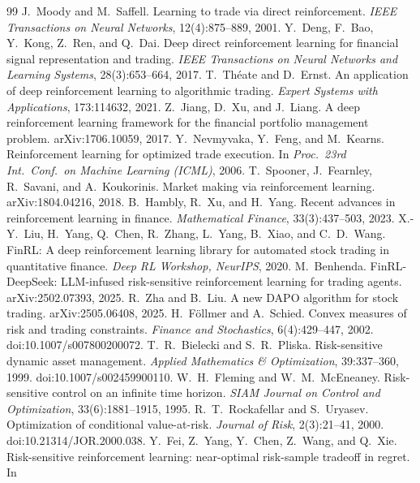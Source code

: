 \documentclass[11pt]{article}
\theoremstyle{definition}
\begin{document}
\begin{thebibliography}{99}
\small
{} J.~Moody and M.~Saffell. Learning to trade via direct
reinforcement. \emph{IEEE Transactions on Neural Networks}, 12(4):875--889, 2001.
 Y.~Deng, F.~Bao, Y.~Kong, Z.~Ren, and Q.~Dai. Deep direct
reinforcement learning for financial signal representation and trading. \emph{IEEE
Transactions on Neural Networks and Learning Systems}, 28(3):653--664, 2017.
 T.~Th\'eate and D.~Ernst. An application of deep reinforcement
learning to algorithmic trading. \emph{Expert Systems with Applications}, 173:114632,
2021.
 Z.~Jiang, D.~Xu, and J.~Liang. A deep reinforcement learning
framework for the financial portfolio management problem. arXiv:1706.10059, 2017.
 Y.~Nevmyvaka, Y.~Feng, and M.~Kearns. Reinforcement learning
for optimized trade execution. In \emph{Proc.\ 23rd Int.\ Conf.\ on Machine Learning
(ICML)}, 2006.
 T.~Spooner, J.~Fearnley, R.~Savani, and A.~Koukorinis. Market
making via reinforcement learning. arXiv:1804.04216, 2018.
 B.~Hambly, R.~Xu, and H.~Yang. Recent advances in reinforcement
learning in finance. \emph{Mathematical Finance}, 33(3):437--503, 2023.
 X.-Y.~Liu, H.~Yang, Q.~Chen, R.~Zhang, L.~Yang, B.~Xiao, and
C.~D.~Wang. FinRL: A deep reinforcement learning library for automated stock trading
in quantitative finance. \emph{Deep RL Workshop, NeurIPS}, 2020.
 M.~Benhenda. FinRL-DeepSeek: LLM-infused risk-sensitive
reinforcement learning for trading agents. arXiv:2502.07393, 2025.
 R.~Zha and B.~Liu. A new DAPO algorithm for stock trading.
arXiv:2505.06408, 2025.
 H.~F\"ollmer and A.~Schied. Convex measures of risk and trading
constraints. \emph{Finance and Stochastics}, 6(4):429--447, 2002.
doi:10.1007/s007800200072.
 T.~R.~Bielecki and S.~R.~Pliska. Risk-sensitive dynamic asset
management. \emph{Applied Mathematics \& Optimization}, 39:337--360, 1999.
doi:10.1007/s002459900110.
 W.~H.~Fleming and W.~M.~McEneaney. Risk-sensitive control on
an infinite time horizon. \emph{SIAM Journal on Control and Optimization},
33(6):1881--1915, 1995.
 R.~T.~Rockafellar and S.~Uryasev. Optimization of conditional
value-at-risk. \emph{Journal of Risk}, 2(3):21--41, 2000. doi:10.21314/JOR.2000.038.
 Y.~Fei, Z.~Yang, Y.~Chen, Z.~Wang, and Q.~Xie. Risk-sensitive
reinforcement learning: near-optimal risk-sample tradeoff in regret. In

\end{thebibliography}
\end{document}
